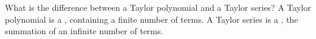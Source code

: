 {What is the difference between a Taylor polynomial and a Taylor series?
}
{A Taylor polynomial is a , containing a finite number of terms. A Taylor series is a , the summation of an infinite number of terms.
}